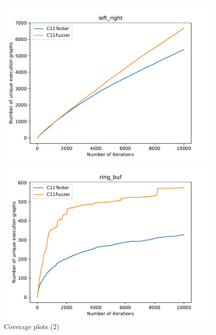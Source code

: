\begin{figure}[H]
    \begin{minipage}{0.45\textwidth}
        \centering
        \includegraphics[width=\textwidth]{figure/left_right.pdf}
    \end{minipage}
    \hfill
    \begin{minipage}{0.45\textwidth}
        \centering
        \includegraphics[width=\textwidth]{figure/ring_buf.pdf}
    \end{minipage}

    \caption{Coverage plots (2)}
    \label{c11tester:cov-plts2}
\end{figure}







